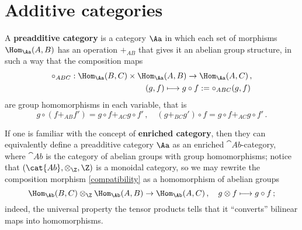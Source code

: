 \section{Additive categories}\label{AdditiveCategories}

\begin{df}
    A \textbf{preadditive category} is a category $\Aa$ 
    in which each set  of morphisms $\Hom_{\Aa}(A,B)$ has an operation $+_{AB}$
    that gives it an abelian group structure, 
    in such a way that the composition maps
    \begin{equation}\label{compatibility}
    \begin{split}
        \circ_{ABC} : \Hom_{\Aa}(B,C) \times \Hom_{\Aa}(A,B) \to \Hom_{\Aa}(A,C)\,, \\
        \quad (g,f) \longmapsto  g \circ f := \circ_{ABC}(g,f)\,
    \end{split}
    \end{equation}
    are group homomorphisms in each variable, that is
    \begin{equation*}
        g \circ (f +_{AB} f') = g \circ f +_{AC} g \circ f'\,,
        \quad (g +_{BC} g') \circ f = g \circ f +_{AC} g \circ f'\,.
    \end{equation*}
\end{df}

\begin{rmk}
    If one is familiar with the concept of 
    \textbf{enriched category},
    then they can equivalently define 
    a preadditive category $\Aa$ as an enriched 
    $\cat{Ab}$-category, %
    where $\cat{Ab}$ is the category
    of abelian groups with group homomorphisms;
    notice that  $(\cat{Ab},\otimes_{\Z},\Z)$ 
    is a monoidal category, 
    so we may rewrite the composition morphism \eqref{compatibility}
    as a homomorphism of abelian groups
    \begin{equation*}
        \Hom_{\Ab}(B,C) \otimes_{\Z} \Hom_{\Ab}(A,B) \to \Hom_{\Ab}(A,C)\,, 
        \quad g \otimes f \longmapsto g \circ f\,;
    \end{equation*}
    indeed, the universal property the tensor products 
    tells that it ``converts'' bilinear maps
    into homomorphisms.
\end{rmk}

